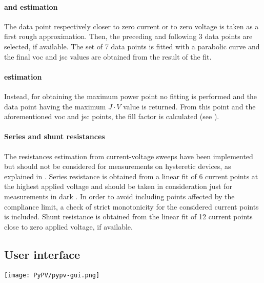 		\paragraph{ and  estimation}
		The data point respectively closer to zero current or to zero voltage is taken as a first rough approximation.
		Then, the preceding and following 3 data points are selected, if available.
		The set of 7 data points is fitted with a parabolic curve and the final \gls{voc} and \gls{jsc} values are obtained from the result of the fit.

		\paragraph{ estimation}
		Instead, for obtaining the maximum power point no fitting is performed and the data point having the maximum $J\cdot V$ value is returned.
		From this point and the aforementioned \gls{voc} and \gls{jsc} points, the fill factor is calculated (see ).

		\paragraph{Series and shunt resistances}
		The resistances estimation from current\hyp{}voltage sweeps have been implemented but should not be considered for measurements on hysteretic devices, as explained in .
		Series resistance is obtained from a linear fit of 6 current points at the highest applied voltage and should be taken in consideration just for measurements in dark \cite{Pysch2007}.
		In order to avoid including points affected by the compliance limit, a check of strict monotonicity for the considered current points is included.
		Shunt resistance is obtained from the linear fit of 12 current points close to zero applied voltage, if available.


	\subsection{User interface}

		\begin{sidewaysfigure}
			\centering
			\texttt{[image: PyPV/pypv-gui.png]}
			\label{fig:pypv-gui}
		\end{sidewaysfigure}

